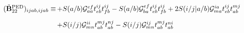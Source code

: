 \begin{subappendices}
\begin{equation}
    \begin{array}{r@{\,}l}
        (\tilde{\mathbf{B}}_{22}^\mathrm{PED})_{ijab,ijab}
        \equiv
        &
        +
        S(a/b)
        \mathcal{G}_{aa}^{ef}
        t_{eb}^{ij}
        t_{fb}^{ij}
        -
        S(a/b)
        \mathcal{G}_{ba}^{ef}
        t_{eb}^{ij}
        t_{fb}^{ij}
        +
        2
        S(i/j|a/b)
        \mathcal{G}_{ma}^{ia}
        t_{eb}^{ij}
        t_{ab}^{mj}
        \\[10pt]
        &
        +
        S(i/j)
        \mathcal{G}_{mn}^{ii}
        t_{ab}^{mj}
        t_{ab}^{nj}
        -
        S(i/j)
        \mathcal{G}_{mn}^{ij}
        t_{ab}^{mj}
        t_{ab}^{ni}
    \end{array}
\end{equation}

\end{subappendices}
